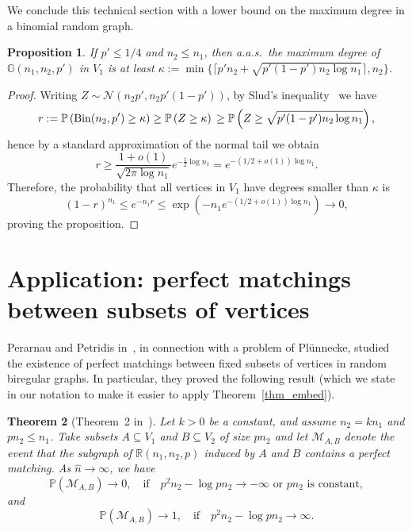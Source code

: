 \documentclass[12pt,reqno]{amsart}
\newcommand{\Prob} {\mathbb {P}}
\newcommand{\prob}[1]{\Prob\left(#1\right)}
\newcommand{\R} {\mathbb R}
\newcommand{\G} {\mathbb G}
\newcommand{\Bi}{\operatorname{Bin}}
\newtheorem{theorem}{Theorem}
\newtheorem{proposition}[theorem]{Proposition}
\theoremstyle{definition}
\newcommand{\ceil}[1]{\lceil{#1}\rceil}
\begin{document}
We conclude this technical section with a lower bound on the maximum degree in a binomial random graph.
\begin{proposition}
  \label{prop_maxdeg}
  If $p' \le 1/4$ and $n_2 \le n_1$, then a.a.s.\ the maximum degree of $\G(n_1,n_2,p')$ in $V_1$ is at least $\kappa := \min \{ \ceil{p'n_2 + \sqrt{p'(1-p')n_2\log n_1}}, n_2 \}$.
\end{proposition}
\begin{proof}
  Writing $Z \sim \mathcal{N}(n_2p', n_2p'(1- p'))$, by Slud's inequality~\cite[Theorem 2.1]{S77} we have
	\begin{equation*}
	  r := \prob{\Bi(n_2,p') \ge \kappa} \ge \prob{Z \ge \kappa} \\
	   \ge \prob{Z \ge \sqrt{p'(1-p')n_2\log n_1}},
	\end{equation*}
	hence by a standard approximation of the normal tail we obtain
	\begin{equation*}
		r \ge \frac{1 + o(1)}{\sqrt{2\pi \log n_1}}e^{-\frac{1}{2}\log n_1} =
		e^{ - (1/2 + o(1)) \log n_1 }.
	\end{equation*}
	Therefore, the probability that all vertices in $V_1$ have degrees smaller than $\kappa$ is
\begin{equation*}
  (1-r)^{n_1} \le e^{ - n_1 r} \le \exp \left( -n_1e^{-(1/2 + o(1))\log n_1} \right) \to 0,
\end{equation*}
proving the proposition.
\end{proof}

\section{Application: perfect matchings between subsets of vertices}
\label{sec_PP}

Perarnau and Petridis in~\cite{PePe}, in connection with a problem of Pl\"unnecke, studied the existence of perfect matchings between fixed subsets of vertices in random biregular graphs. In particular, they proved the following result (which we state in our notation to make it easier to apply Theorem~\ref{thm_embed}).

\begin{theorem}[Theorem~2 in~\cite{PePe}]
  \label{thm_PP}
  Let  $k>0$ be a constant, and assume $n_2 = kn_1$ and $pn_2 \le n_1$. Take subsets $A\subseteq V_1$ and $B\subseteq V_2$ of size $pn_2$ and let $\mathcal M_{A,B}$ denote the event that the subgraph of $\R(n_1, n_2, p)$ induced by $A$ and $B$ contains a perfect matching. As $\hat n \to \infty$, we have
  \begin{equation*}
    \prob{\mathcal M_{A,B}} \to
    0, \quad \text{if} \quad p^2n_2 - \log pn_2 \to -\infty \text{ or } pn_2 \text{ is constant},
  \end{equation*}
  and
   \begin{equation}
     \label{eq_PP}
	   \prob{\mathcal M_{A,B}} \to
     1, \quad \text{if} \quad p^2n_2 - \log pn_2 \to \infty.
   \end{equation}
\end{theorem}
\end{document}
